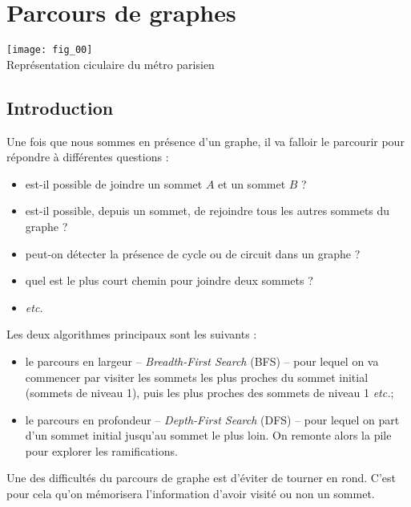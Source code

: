 \chapter{Parcours de graphes} 
 

\begin{marginfigure}
\texttt{[image: fig\_00]} \\
\caption{Représentation ciculaire du métro parisien}
\end{marginfigure}%



\section{Introduction}
Une fois que nous sommes en présence d'un graphe, il va falloir le parcourir pour répondre à différentes questions : 
\begin{itemize}
\item est-il possible de joindre un sommet $A$ et un sommet $B$ ?
\item est-il possible, depuis un sommet, de rejoindre tous les autres sommets du graphe ?
\item peut-on détecter la présence de cycle ou de circuit dans un graphe ?
\item quel est le plus court chemin pour joindre deux sommets ?
\item \textit{etc.}
\end{itemize}

Les deux algorithmes principaux sont les suivants :
\begin{itemize}
\item le parcours en largeur -- \textit{Breadth-First Search} (BFS) -- pour lequel on va commencer par visiter les sommets les plus proches du sommet initial (sommets de niveau 1), puis les plus proches des sommets de niveau 1 \textit{etc.};
\item le parcours en profondeur  -- \textit{Depth-First Search} (DFS) -- pour lequel on part d'un sommet initial jusqu'au sommet le plus loin. On remonte alors la pile pour explorer les ramifications.
\end{itemize}

Une des difficultés du parcours de graphe est d'éviter de tourner en rond. C'est pour cela qu'on mémorisera l'information d'avoir visité ou non un sommet. 

